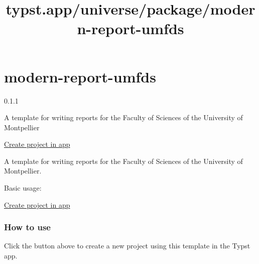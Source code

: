 \title{typst.app/universe/package/modern-report-umfds}

\label{banner}
\label{template-thumbnail}

\section{modern-report-umfds}\label{modern-report-umfds}

{ 0.1.1 }

A template for writing reports for the Faculty of Sciences of the
University of Montpellier

\href{/app?template=modern-report-umfds&version=0.1.1}{Create project in
app}

\label{readme}
A template for writing reports for the Faculty of Sciences of the
University of Montpellier.

Basic usage:

\begin{Shaded}
\begin{Highlighting}[]

\NormalTok{  ),}
\NormalTok{  abstract: [}
\NormalTok{  ],}
\NormalTok{)}

\end{Highlighting}
\end{Shaded}

\href{/app?template=modern-report-umfds&version=0.1.1}{Create project in
app}

\subsubsection{How to use}\label{how-to-use}

Click the button above to create a new project using this template in
the Typst app.

